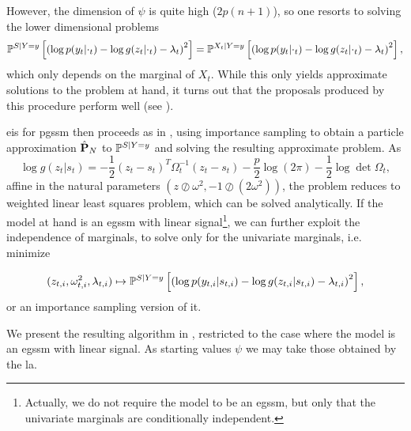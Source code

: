 However, the dimension of $\psi$ is quite high ($2p(n+1)$), so one resorts to solving the lower dimensional problems 
\begin{align}
    \label{eq:eis_marginals_problem}
    \Pps \left[ \left( \log p(y_{t}|\cdot_{t}) -  \log g(z_{t}|\cdot_{t}) - \lambda_{t} \right)^{2} \right] = \mathbb P^{X_{t}|Y=y} \left[ \left( \log p(y_{t}|\cdot_{t}) -  \log g(z_{t}|\cdot_{t}) - \lambda_{t} \right)^{2} \right],
\end{align}
which only depends on the marginal of $X_{t}$. While this only yields approximate solutions to the problem at hand, it turns out that the proposals produced by this procedure perform well (see ).

\acrshort{eis} for \acrshort{pgssm} then proceeds as in , using importance sampling to obtain a particle approximation $\hat \P_{N}$ to $\Pps$ and solving the resulting approximate problem. As 
$$
    \log g(z_{t}|s_{t}) = - \frac{1}{2} (z_{t} - s_{t})^{T}\Omega_{t}^{-1}(z_{t} - s_{t})- \frac{p}{2}\log (2\pi) - \frac{1}{2} \log\det \Omega_{t},
$$
affine in the natural parameters $\left( z \oslash \omega^{2}, -1 \oslash (2\omega^{2}) \right)$, the problem reduces to weighted linear least squares problem, which can be solved analytically. If the model at hand is an \acrshort{egssm} with linear signal\footnote{Actually, we do not require the model to be an \acrshort{egssm}, but only that the univariate marginals are conditionally independent.}, we can further exploit the independence of marginals, to solve only for the univariate marginals, i.e. minimize

\begin{align}
    \label{eq:eis-marignals-target}
    (z_{t,i}, \omega^{2}_{t,i}, \lambda_{t,i}) \mapsto \Pps \left[ \left( \log p(y_{t,i}|s_{t,i}) - \log g(z_{t,i}|s_{t,i}) - \lambda_{t,i} \right)^{2} \right],
\end{align}
or an importance sampling version of it.

We present the resulting algorithm in , restricted to the case where the model is an \acrshort{egssm} with linear signal. As starting values $\psi$ we may take those obtained by the \acrshort{la}. 

